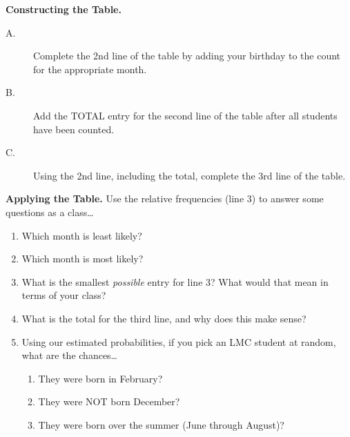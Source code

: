 \textbf{Constructing the Table.}
\begin{description}
\item[A.] Complete the 2nd line of the table by adding your birthday to the count for the appropriate month.
\item[B.] Add the TOTAL entry for the second line of the table after all students have been counted.
\item[C.] Using the 2nd line, including the total, complete the 3rd line of the table.
\end{description}
\newpage
\textbf{Applying the Table.} Use the relative frequencies (line 3) to answer some questions as a class\dots

\begin{enumerate}
\item Which month is least likely?\\[.5cm]
\item Which month is most likely?\\[.5cm]
\item What is the smallest \emph{possible} entry for line 3? What would that mean in terms of your class?\\[.5cm]
\item What is the total for the third line, and why does this make sense?\\[.5cm]
\item Using our estimated probabilities, if you pick an LMC student at random, what are the chances\dots
\begin{enumerate}
\item They were born in February?\\[.5cm]
\item They were NOT born December?\\[.5cm]
\item They were born over the summer (June through August)?\\[.5cm]
\end{enumerate}
\end{enumerate}

